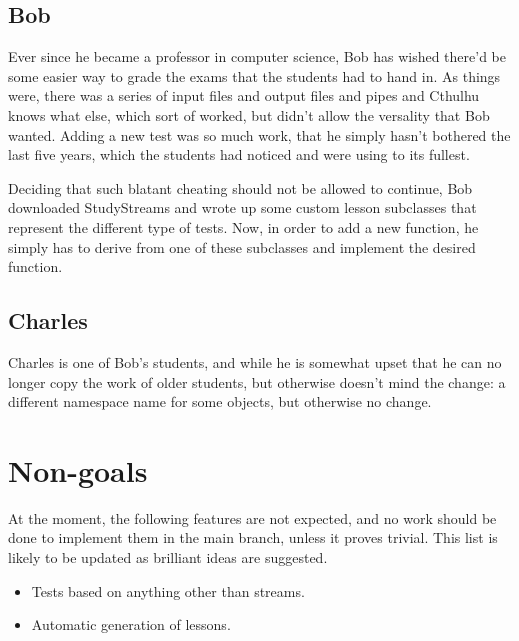 \documentclass[12pt,a4paper]{report}
\begin{document}
		\section{Bob}
			Ever since he became a professor in computer science, Bob has wished
			there'd be some easier way to grade the exams that the students had
			to hand in.  As things were, there was a series of input files and
			output files and pipes and Cthulhu knows what else, which sort of
			worked, but didn't allow the versality that Bob wanted.  Adding a new
			test was so much work, that he simply hasn't bothered the last five
			years, which the students had noticed and were using to its fullest.

			Deciding that such blatant cheating should not be allowed to continue,
			Bob downloaded StudyStreams and wrote up some custom lesson subclasses
			that represent the different type of tests.  Now, in order to add a new
			function, he simply has to derive from one of these subclasses and
			implement the desired function.

		\section{Charles}
			Charles is one of Bob's students, and while he is somewhat upset that
			he can no longer copy the work of older students, but otherwise doesn't
			mind the change:  a different namespace name for some objects, but
			otherwise no change.

	\chapter{Non-goals}
		At the moment, the following features are not expected, and no work
		should be done to implement them in the main branch, unless it proves
		trivial.  This list is likely to be updated as brilliant ideas are suggested.
		\begin{itemize}
			\item Tests based on anything other than streams.
			\item Automatic generation of lessons.
		\end{itemize}
\end{document}
